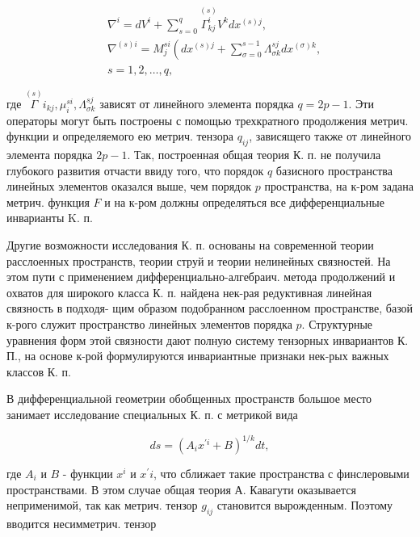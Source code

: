 \documentclass[10pt]{article}
\begin{document}
\[

\begin{aligned}

& \nabla^{i}=d V^{i}+\sum_{s=0}^{q} \stackrel{(s)}{\Gamma_{k j}^{i}} V^{k} d x^{(s) j}, \\

& \nabla^{(s) i}=M_{j}^{s i}\left(d x^{(s) j}+\sum_{\sigma=0}^{s-1} \Lambda_{\sigma k}^{s j} d x^{(\sigma) k},\right. \\

& s=1,2, \ldots, q \text {, }

\end{aligned}

\]



где $\stackrel{(s)}{\Gamma} i_{k j}, \mu_{i}^{s i}, \Lambda_{\sigma k}^{s j}$ зависят от линейного элемента порядка $q=2 p-1$. Эти операторы могут быть построены с помощью трехкратного продолжения метрич. функции и определяемого ею метрич. тензора $q_{i j}$, зависящего также от линейного элемента порядка $2 p-1$. Так, построенная общая теория К. п. не получила глубокого развития отчасти ввиду того, что порядок $q$ базисного пространства линейных элементов оказался выше, чем порядок $p$ пространства, на к-ром задана метрич. функция $F$ и на к-ром должны определяться все дифференциальные инварианты K. п.



Другие возможности исследования К. п. основаны на современной теории расслоенных пространств, теории струй и теории нелинейных связностей. На этом пути с применением дифференциально-алгебраич. метода продолжений и охватов для широкого класса К. п. найдена нек-рая редуктивная линейная связность в подходя- щим образом подобранном расслоенном пространстве, базой к-рого служит пространство линейных элементов порядка $p$. Структурные уравнения форм этой связности дают полную систему тензорных инвариантов К. П., на основе к-рой формулируются инвариантные признаки нек-рых важных классов К. п.



В дифференциальной геометрии обобщенных пространств большое место занимает исследование специальных К. п. с метрикой вида



\[

d s=\left(A_{i} x^{\prime i}+B\right)^{1 / k} d t,

\]



где $A_{i}$ и $B$ - функции $x^{i}$ и $x^{\prime} i$, что сближает такие пространства с финслеровыми пространствами. В этом случае общая теория А. Кавагути оказывается неприменимой, так как метрич. тензор $g_{i j}$ становится вырожденным. Поэтому вводится несимметрич. тензор
\end{document}
